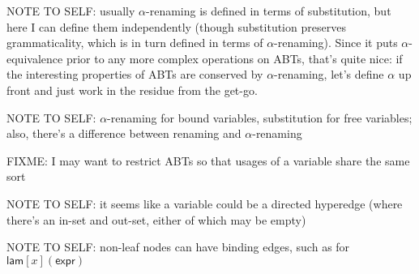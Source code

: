 \documentclass[11pt]{article} %
\theoremstyle{definition}
\begin{document}
NOTE TO SELF: usually $\alpha$-renaming is defined in terms of substitution, but here I can define them independently (though substitution preserves grammaticality, which is in turn defined in terms of $\alpha$-renaming). Since it puts $\alpha$-equivalence prior to any more complex operations on ABTs, that's quite nice: if the interesting properties of ABTs are conserved by $\alpha$-renaming, let's define $\alpha$ up front and just work in the residue from the get-go.

NOTE TO SELF: $\alpha$-renaming for bound variables, substitution for free variables; also, there's a difference between renaming and $\alpha$-renaming

FIXME: I may want to restrict ABTs so that usages of a variable share the same sort

NOTE TO SELF: it seems like a variable could be a directed hyperedge (where there's an in-set and out-set, either of which may be empty)

NOTE TO SELF: non-leaf nodes can have binding edges, such as for $\mathsf{lam}[x](\mathsf{expr})$
\end{document}
